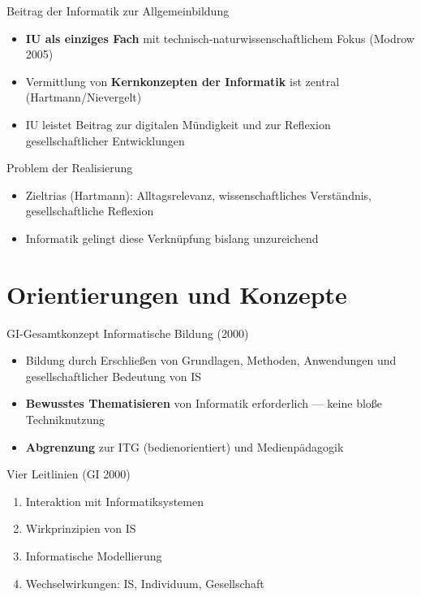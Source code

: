 \documentclass{article}
\begin{document}
\begin{block}{Beitrag der Informatik zur Allgemeinbildung}
    \begin{itemize}
        \item \textbf{IU als einziges Fach} mit technisch-naturwissenschaftlichem Fokus (Modrow 2005)
        \item Vermittlung von \textbf{Kernkonzepten der Informatik} ist zentral (Hartmann/Nievergelt)
        \item IU leistet Beitrag zur digitalen Mündigkeit und zur Reflexion gesellschaftlicher Entwicklungen
    \end{itemize}
\end{block}

\begin{block}{Problem der Realisierung}
    \begin{itemize}
        \item Zieltrias (Hartmann): Alltagsrelevanz, wissenschaftliches Verständnis, gesellschaftliche Reflexion
        \item Informatik gelingt diese Verknüpfung bislang unzureichend
    \end{itemize}
\end{block}

\section{Orientierungen und Konzepte}
\begin{block}{GI-Gesamtkonzept Informatische Bildung (2000)}
    \begin{itemize}
        \item Bildung durch Erschließen von Grundlagen, Methoden, Anwendungen und gesellschaftlicher Bedeutung von IS
        \item \textbf{Bewusstes Thematisieren} von Informatik erforderlich — keine bloße Techniknutzung
        \item \textbf{Abgrenzung} zur ITG (bedienorientiert) und Medienpädagogik
    \end{itemize}
\end{block}

\begin{block}{Vier Leitlinien (GI 2000)}
    \begin{enumerate}
        \item Interaktion mit Informatiksystemen
        \item Wirkprinzipien von IS
        \item Informatische Modellierung
        \item Wechselwirkungen: IS, Individuum, Gesellschaft
    \end{enumerate}
\end{block}
\end{document}
